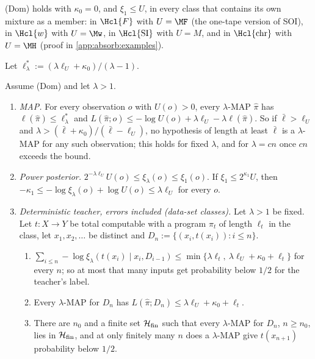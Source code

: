 \begin{remark}\label{rem:absorb:examples}
(Dom) holds with $\kappa_0=0$, and $\xi_1\le U$, in every class that contains its own mixture as a member: in $\Hcl{F}$ with $U=\MF$ (the one-tape version of SOI), in $\Hcl{w}$ with $U=\Mw$, in $\Hcl{\mathrm{SI}}$ with $U=M$, and in $\Hcl{\mathrm{chr}}$ with $U=\MH$ (proof in \cref{app:absorb:examples}).
\end{remark}

Let $\ell^*_\lambda:=(\lambda\ell_U+\kappa_0)/(\lambda-1)$.

\begin{theorem}[Absorption]\label{thm:absorb:absorption}
Assume (Dom) and let $\lambda>1$.
\begin{enumerate}[label=(\alph*),itemsep=0pt,topsep=2pt]
\item \emph{MAP.} For every observation $o$ with $U(o)>0$, every $\lambda$-MAP $\hat\pi$ has $\ell(\hat\pi)\le\ell^*_\lambda$ and $L(\hat\pi;o)\le-\log U(o)+\lambda\ell_U-\lambda\ell(\hat\pi)$. So if $\bar\ell>\ell_U$ and $\lambda>(\bar\ell+\kappa_0)/(\bar\ell-\ell_U)$, no hypothesis of length at least $\bar\ell$ is a $\lambda$-MAP for any such observation; this holds for fixed $\lambda$, and for $\lambda=cn$ once $cn$ exceeds the bound.
\item \emph{Power posterior.} $2^{-\lambda\ell_U}U(o)\le\xi_\lambda(o)\le\xi_1(o)$. If $\xi_1\le2^{\kappa_1}U$, then $-\kappa_1\le-\log\xi_\lambda(o)+\log U(o)\le\lambda\ell_U$ for every $o$.
\item \emph{Deterministic teacher, errors included (data-set classes).} Let $\lambda>1$ be fixed. Let $t:X\to Y$ be total computable with a program $\pi_t$ of length $\ell_t$ in the class, let $x_1,x_2,\dots$ be distinct and $D_n:=\{(x_i,t(x_i)):i\le n\}$.
\begin{enumerate}[label=(c\arabic*),itemsep=0pt,topsep=0pt]
\item $\sum_{i\le n}-\log\xi_\lambda(t(x_i)\mid x_i,D_{i-1})\le\min\{\lambda\ell_t,\ \lambda\ell_U+\kappa_0+\ell_t\}$ for every $n$; so at most that many inputs get probability below $1/2$ for the teacher's label.
\item Every $\lambda$-MAP for $D_n$ has $L(\hat\pi;D_n)\le\lambda\ell_U+\kappa_0+\ell_t$.
\item There are $n_0$ and a finite set $\mathcal H_{\rm fin}$ such that every $\lambda$-MAP for $D_n$, $n\ge n_0$, lies in $\mathcal H_{\rm fin}$, and at only finitely many $n$ does a $\lambda$-MAP give $t(x_{n+1})$ probability below $1/2$.

\end{enumerate}
\end{enumerate}
\end{theorem}
